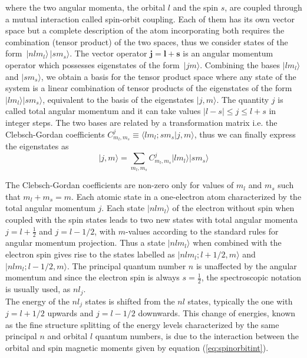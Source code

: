 \documentclass[openany,11pt,a4paper]{report}
\newcommand{\ket}[1]{\, | #1 \rangle}
\begin{document}
where the two angular momenta, the orbital $l$ and the spin $s$, are coupled through a mutual interaction called spin-orbit coupling. Each of them has its own vector space but a complete description of the atom incorporating both requires the combination (tensor product) of the two spaces, thus we consider states of the form $\ket{nlm_{l}} \ket{sm_{s}}$. The vector operator $\bm{j} = \bm{l} + \bm{s}$ is an angular momentum operator which possesses eigenstates of the form $\ket{jm}$.
Combining the bases {$\vert l m_l\rangle$}   and {$\vert s m_{s}\rangle$}, we obtain a basis for the tensor product space where any state of the system is a linear combination of tensor products of the eigenstates of the form $\vert l m_{l}\rangle \vert s m_{s}\rangle$, equivalent to the basis of the eigenstates $\vert j,m\rangle$. The quantity $j$ is called total angular momentum and it can take values $ \mid l- s \mid \leq j \leq l+s$ in integer steps.  The two bases are related by a transformation matrix i.e. the Clebsch-Gordan coefficients $C_{m_{l},m_{s}}^{j}\equiv \langle l m_{l} ; sm_{s}\vert j, m \rangle $, thus we can finally express the eigenstates as
\begin{equation}
\vert j,m\rangle= \sum_{m_{l},m_{s}} C_{m_{l},m_{s}}^{j} \vert l m_{l}\rangle \vert sm_{s}\rangle
\end{equation}

The Clebsch-Gordan coefficients are non-zero only for values of $m_{l}$ and $m_{s}$ such that $m_{l} + m_{s} = m$. Each atomic state in a one-electron atom characterized by the
total angular momentum $j$. Each state $\vert nlm_{l}\rangle$ of the electron without spin when coupled with the spin states leads to two new states with total angular momenta $j = l + \frac{1}{2}$
and $j = l - 1/2$, with $m$-values according to the standard rules for angular momentum projection.
Thus a state $\vert nlm_{l} \rangle$ when combined with the electron spin gives rise to the states labelled as $\vert nlm_{l}; l+1/2,m \rangle$ and $\vert nlm_{l}; l- 1/2,m\rangle $. The principal quantum number $n$ is unaffected by the angular momentum and since the electron spin is always $s=\frac{1}{2}$, the spectroscopic notation is usually used, as $nl_j$.\\

The energy of the $nl_j$ states is shifted from the $nl$ states, typically the one with $j = l + 1/2$ upwards and $j = l - 1/2$ downwards. This change of energies, known as the fine structure splitting of the energy levels characterized by the same principal $n$ and orbital $l$ quantum numbers, is due to the interaction between the orbital and spin magnetic moments given by equation (\ref{eq:spinorbitint}).\cite{ls}\\                                                                                          
\end{document}
